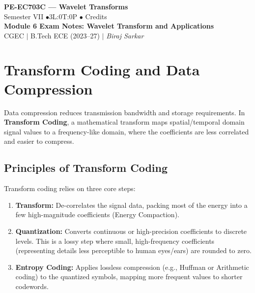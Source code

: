 \documentclass[12pt,a4paper]{article}
\begin{document}

\begin{center}
  {\LARGE\bfseries\color{myred} PE-EC703C --- Wavelet Transforms}\\[5pt]
  {\normalsize\color{mydark} Semester VII \quad$\bullet$\quad 3L:0T:0P \quad$\bullet$ Credits}\\[3pt]
  {\normalsize\color{myteal}\textbf{Module 6 Exam Notes: Wavelet Transform and Applications}}\\[3pt]
  {\small\color{mydark} CGEC \;$|$\; B.Tech ECE (2023--27) \;$|$\; \textit{Biraj Sarkar}}
\end{center}
\noindent{\color{myred}\rule{\linewidth}{1.5pt}}
\vspace{2pt}

\hypersetup{linkcolor=mydark}
\tableofcontents
\hypersetup{linkcolor=myteal}
\newpage

\section{Transform Coding and Data Compression}

Data compression reduces transmission bandwidth and storage requirements. In \textbf{Transform Coding}, a mathematical transform maps spatial/temporal domain signal values to a frequency-like domain, where the coefficients are less correlated and easier to compress.

\subsection{Principles of Transform Coding}
Transform coding relies on three core steps:
\begin{enumerate}[leftmargin=*, itemsep=4pt]
  \item \textbf{Transform:} De-correlates the signal data, packing most of the energy into a few high-magnitude coefficients (Energy Compaction).
  \item \textbf{Quantization:} Converts continuous or high-precision coefficients to discrete levels. This is a lossy step where small, high-frequency coefficients (representing details less perceptible to human eyes/ears) are rounded to zero.
  \item \textbf{Entropy Coding:} Applies lossless compression (e.g., Huffman or Arithmetic coding) to the quantized symbols, mapping more frequent values to shorter codewords.
\end{enumerate}
\end{document}
